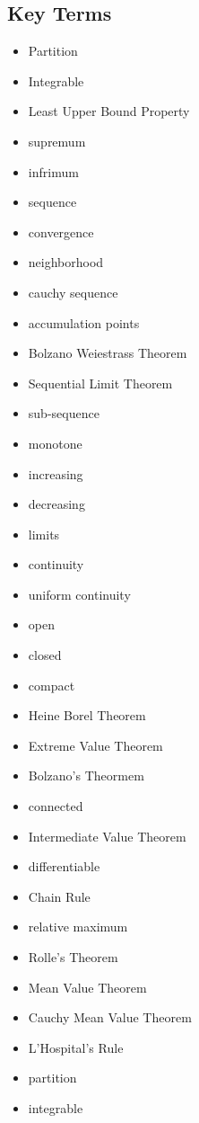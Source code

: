\documentclass[12pt]{article}
\begin{document}
\subsection*{Key Terms}
\begin{itemize}
    \item Partition 
    \item Integrable
    \item Least Upper Bound Property 
    \item supremum 
    \item infrimum 
    \item sequence 
    \item convergence
    \item neighborhood 
    \item cauchy sequence 
    \item accumulation points 
    \item Bolzano Weiestrass Theorem 
    \item Sequential Limit Theorem 
    \item sub-sequence 
    \item monotone 
    \item increasing 
    \item decreasing 
    \item limits 
    \item continuity 
    \item uniform continuity 
    \item open 
    \item closed 
    \item compact 
    \item Heine Borel Theorem 
    \item Extreme Value Theorem 
    \item Bolzano's Theormem 
    \item connected 
    \item Intermediate Value Theorem 
    \item differentiable 
    \item Chain Rule 
    \item relative maximum 
    \item Rolle's Theorem 
    \item Mean Value Theorem 
    \item Cauchy Mean Value Theorem 
    \item L'Hospital's Rule 
    \item partition 
    \item integrable 
\end{itemize}
\end{document}
